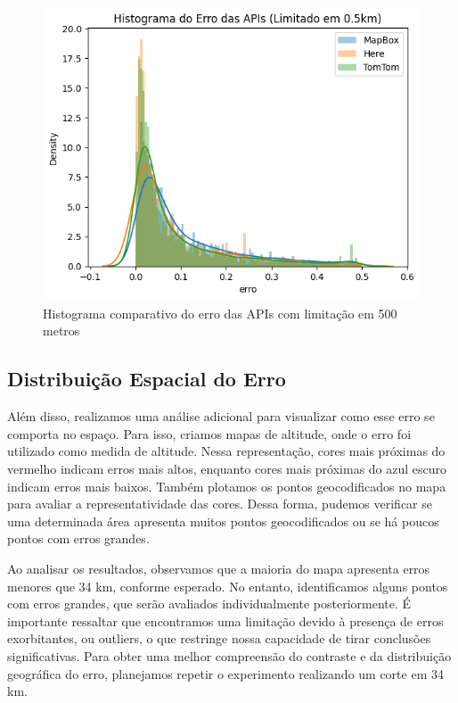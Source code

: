 \documentclass{article}
\begin{document}
\begin{figure}[h]
  \centering
  \includegraphics[width=\textwidth]{hist5.png}
  \caption{Histograma comparativo do erro das APIs com limitação em 500 metros}
  \label{fig:hist5}
\end{figure}

\subsection{Distribuição Espacial do Erro}
Além disso, realizamos uma análise adicional para visualizar como esse erro se comporta no espaço. Para isso, criamos mapas de altitude, onde o erro foi utilizado como medida de altitude. Nessa representação, cores mais próximas do vermelho indicam erros mais altos, enquanto cores mais próximas do azul escuro indicam erros mais baixos. Também plotamos os pontos geocodificados no mapa para avaliar a representatividade das cores. Dessa forma, pudemos verificar se uma determinada área apresenta muitos pontos geocodificados ou se há poucos pontos com erros grandes.

Ao analisar os resultados, observamos que a maioria do mapa apresenta erros menores que 34 km, conforme esperado. No entanto, identificamos alguns pontos com erros grandes, que serão avaliados individualmente posteriormente. É importante ressaltar que encontramos uma limitação devido à presença de erros exorbitantes, ou outliers, o que restringe nossa capacidade de tirar conclusões significativas. Para obter uma melhor compreensão do contraste e da distribuição geográfica do erro, planejamos repetir o experimento realizando um corte em 34 km.
\end{document}

